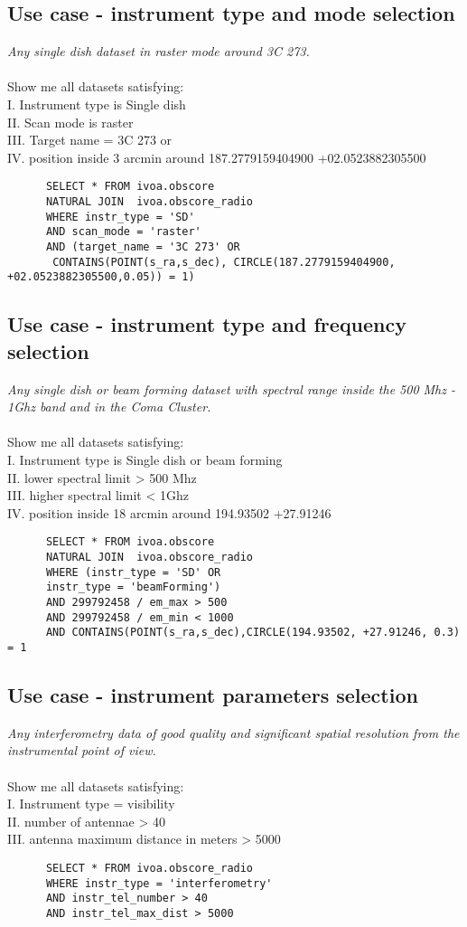 \subsection{Use case -  instrument type and mode selection }
\label{sec:instrument-mode}
\textit{Any single dish  dataset  in raster mode around 3C 273.}\\ \\
Show me all datasets satisfying:\\
I. Instrument type is Single dish \\
II. Scan mode is raster \\
III. Target name = 3C 273 or \\
IV. position inside 3 arcmin around  	187.2779159404900 +02.0523882305500
\begin{verbatim}
      SELECT * FROM ivoa.obscore 
      NATURAL JOIN  ivoa.obscore_radio
      WHERE instr_type = 'SD' 
      AND scan_mode = 'raster' 
      AND (target_name = '3C 273' OR
       CONTAINS(POINT(s_ra,s_dec), CIRCLE(187.2779159404900, +02.0523882305500,0.05)) = 1)     
\end{verbatim}



\subsection{Use case - instrument type and frequency selection }
\textit{Any single dish or beam forming dataset  with spectral range inside the 500 Mhz - 1Ghz band and in the Coma Cluster.}\\ \\
Show me all datasets satisfying:\\
I. Instrument type is Single dish or beam forming \\
II. lower spectral limit > 500 Mhz \\
III. higher spectral limit < 1Ghz \\
IV. position inside 18 arcmin around 194.93502 +27.91246

\begin{verbatim}
      SELECT * FROM ivoa.obscore 
      NATURAL JOIN  ivoa.obscore_radio
      WHERE (instr_type = 'SD' OR
      instr_type = 'beamForming') 
      AND 299792458 / em_max > 500 
      AND 299792458 / em_min < 1000 
      AND CONTAINS(POINT(s_ra,s_dec),CIRCLE(194.93502, +27.91246, 0.3) = 1     
\end{verbatim}



\subsection{Use case - instrument parameters selection }
\textit{Any interferometry data of good quality and significant spatial resolution from the instrumental point of view. }\\ \\
Show me all datasets satisfying:\\
I. Instrument type = visibility \\
II. number of antennae > 40 \\
III. antenna maximum distance in meters  > 5000 \\

\begin{verbatim}
      SELECT * FROM ivoa.obscore_radio
      WHERE instr_type = 'interferometry' 
      AND instr_tel_number > 40 
      AND instr_tel_max_dist > 5000 
\end{verbatim}



